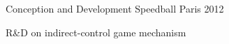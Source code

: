 \begin{cventries}
  \cventry
    {Conception and Development} %
    {Speedball} %
    {Paris} %
    {2012} %
    {
      \begin{cvitems} %
        \item {R\&D on indirect-control game mechanism}
      \end{cvitems}
    }

\end{cventries}

